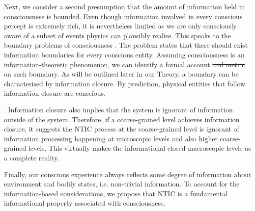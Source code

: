 		Next, we consider a second presumption that the amount of
			\noindent
		information held in consciousness is bounded. Even though information involved in every conscious percept is extremely rich, it is nevertheless limited as we are only consciously aware of a subset of events physics can plausibly realise. This speaks to the boundary problems of consciousness \cite{goff2006experiences}. The problem states that there should exist information boundaries for every conscious entity. Assuming consciousness is an information-theoretic phenomenon, we can identify a formal account \sout{and metric} on such boundary. As will be outlined later in our Theory, a boundary can be characterised by information closure. By prediction, physical entities that follow information closure are conscious.
			\noindent
		
		. 
		Information closure also implies that the system is ignorant of information outside of the system. 
		Therefore, if a coarse-grained level achieves information closure, it suggests the NTIC process at the coarse-grained level is ignorant of information processing happening at microscopic levels and also higher coarse-grained levels. 
		This virtually makes the informational closed macroscopic levels as a complete reality. 

		
		Finally, our conscious experience always reflects some degree of information about environment and bodily states, i.e. non-trivial information. 
		To account for the information-based considerations, we propose that NTIC is a fundamental informational property associated with consciousness. 
		
